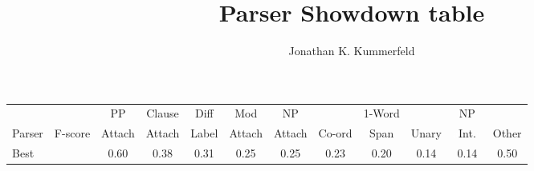 \documentclass[letterpaper,11pt]{article}
\title{Parser Showdown table}
\author{Jonathan K. Kummerfeld}
\date{}
\begin{document}
\maketitle

\begin{table*}[htp]
\small
\renewcommand{\tabcolsep}{1.6mm}
\begin{center}
\begin{tabular}{lccccccccccc}
	\hline
		&
		&
		PP &
		Clause &
		Diff &
		Mod &
		NP &
		&
		1-Word &
		&
		NP &
		\\
		Parser &
		F-score &
		Attach &
		Attach &
		Label &
		Attach &
		Attach &
		Co-ord &
		Span &
		Unary &
		\textcolor{white}{a}Int.\textcolor{white}{a} &
		Other \\
	\hline
	\hline
Best &  & 0.60 & 0.38 & 0.31 & 0.25 & 0.25 & 0.23 & 0.20 & 0.14 & 0.14 & 0.50 \\


\end{tabular}
\end{center}
\end{table*}
\end{document}
